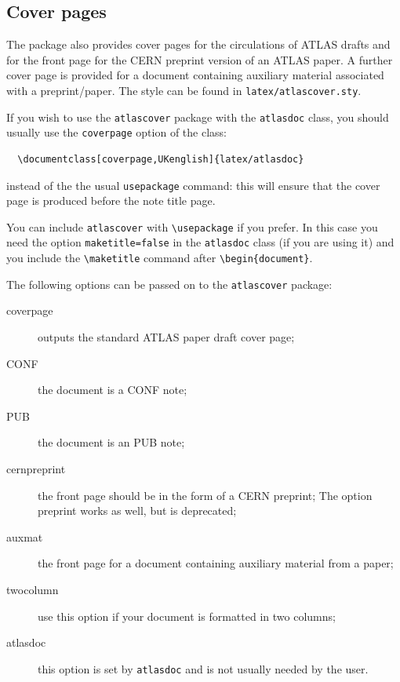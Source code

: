 \documentclass[atlasstyle,UKenglish]{latex/atlasdoc}
\newcommand{\Macro}[1]{\texttt{\textbackslash #1}\xspace}
\newcommand{\Option}[1]{\textsf{#1}\xspace}
\newcommand{\Package}[1]{\texttt{#1}\xspace}
\begin{document}
\subsection{Cover pages}
\label{sec:cover}

The package also provides cover pages for the circulations of ATLAS drafts and 
for the front page for the CERN preprint version of an ATLAS paper.
A further cover page is provided for a document containing auxiliary material associated with a preprint/paper.
The style can be found in \texttt{latex/atlascover.sty}.

If you wish to use the \texttt{atlascover} package with the 
\texttt{atlasdoc} class, you should usually use the \texttt{coverpage} option of the class:
\begin{verbatim}
  \documentclass[coverpage,UKenglish]{latex/atlasdoc}
\end{verbatim}
instead of the the usual \texttt{usepackage} command: this will ensure
that the cover page is produced before the note title page.

You can include \texttt{atlascover} with \Macro{usepackage} if you prefer.
In this case you need the option \texttt{maketitle=false} in the \texttt{atlasdoc} class
(if you are using it)
and you include the \Macro{maketitle} command after \verb|\begin{document}|.

The following options can be passed on to the \Package{atlascover} package:
\begin{description}
\item[\Option{coverpage}] outputs the standard ATLAS paper draft cover page;
\item[\Option{CONF}] the document is a CONF note;
\item[\Option{PUB}] the document is an PUB note;
\item[\Option{cernpreprint}] the front page should be in the form of a CERN preprint;
  The option \Option{preprint} works as well, but is deprecated;
\item[\Option{auxmat}] the front page for a document containing auxiliary material from a paper;
\item[\Option{twocolumn}] use this option if your document is formatted in two columns;
\item[\Option{atlasdoc}] this option is set by \Package{atlasdoc} and is not usually needed by the user.
\end{description}
\end{document}

